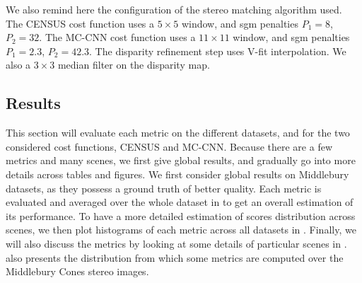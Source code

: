 We also remind here the configuration of the stereo matching algorithm used. The CENSUS cost function uses a $5\times5$ window, and \acrshort{sgm} penalties $P_1=8$, $P_2=32$. The MC-CNN cost function uses a $11\times11$ window, and \acrshort{sgm} penalties $P_1=2.3$, $P_2=42.3$. The disparity refinement step uses V-fit interpolation. We also a $3\times3$ median filter on the disparity map. 

\subsection{Results}\label{sec:results_disparity}
This section will evaluate each metric on the different datasets, and for the two considered cost functions, CENSUS and MC-CNN. Because there are a few metrics and many scenes, we first give global results, and gradually go into more details across tables and figures. We first consider global results on Middlebury datasets, as they possess a ground truth of better quality. Each metric is evaluated and averaged over the whole dataset in  to get an overall estimation of its performance. To have a more detailed estimation of scores distribution across scenes, we then plot histograms of each metric across all datasets in . Finally, we will also discuss the metrics by looking at some details of particular scenes in .  also presents the distribution from which some metrics are computed over the Middlebury Cones stereo images.

